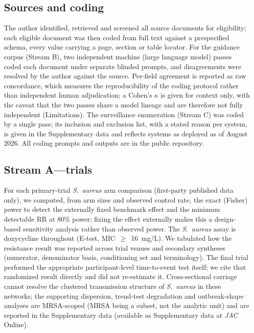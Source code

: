 \documentclass[12pt,a4paper]{article}
\newcommand{\sa}{\emph{S.~aureus}}
\begin{document}
\subsection*{Sources and coding}
The author identified, retrieved and screened all source documents for
eligibility; each eligible document was then coded from full text against a
prespecified schema, every value carrying a page, section or table locator. For
the guidance corpus (Stream B), two independent machine (large language model)
passes coded each document under separate blinded prompts, and disagreements were
resolved by the author against the source. Per-field agreement is reported as raw
concordance, which measures the reproducibility of the coding protocol rather
than independent human adjudication; a Cohen's $\kappa$ is given for context only,
with the caveat that the two passes share a model lineage and are therefore not
fully independent (Limitations). The surveillance enumeration (Stream C) was
coded by a single pass; its inclusion and exclusion list, with a stated reason
per system, is given in the Supplementary data and reflects systems as deployed
as of August 2026. All coding prompts and outputs are in the public repository.

\subsection*{Stream A---trials}
For each primary-trial \sa{} arm comparison (first-party published data only), we
computed, from arm sizes and observed control rate, the exact (Fisher) power to
detect the externally fixed benchmark effect and the minimum detectable RR at
80\% power; fixing the effect externally makes this a design-based sensitivity
analysis rather than observed power. The \sa{} assay is doxycycline throughout
(E-test, MIC~$\geq$~16~mg/L). We tabulated how the resistance result was reported
across trial venues and secondary syntheses (numerator, denominator basis,
conditioning set and terminology). The final trial performed the appropriate
participant-level time-to-event test itself; we cite that randomized result
directly and did not re-estimate it. Cross-sectional carriage cannot resolve the
clustered transmission structure of \sa{} in these networks; the supporting
dispersion, trend-test degradation and outbreak-shape analyses are MRSA-scoped
(MRSA being a subset, not the analytic unit) and are reported in the
Supplementary data (available as Supplementary data at \textit{JAC} Online).
\end{document}
